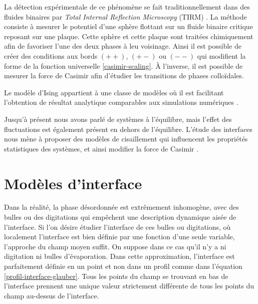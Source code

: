 La détection expérimentale de ce phénomène se fait traditionnellement dans des fluides binaires par \textit{Total Internal Reflection Microscopy} (TIRM) \cite{fukuto_critical_2005,hertlein_direct_2008,gambassi_critical_2009,edison_critical_2015-1}. La méthode consiste à mesurer le potentiel d'une sphère flottant sur un fluide binaire critique reposant sur une plaque. Cette sphère et cette plaque sont traitées chimiquement afin de favoriser l'une des deux phases à leu voisinage. Ainsi il est possible de créer des conditions aux bords $(++)$, $(+-)$ ou $(--)$ qui modifient la forme de la fonction universelle \ref{casimir-scaling}. À l'inverse, il est possible de mesurer la force de Casimir \cite{nguyen_controlling_2013} afin d'étudier les transitions de phases colloïdales.

Le modèle d'Ising appartient à une classe de modèles où il est facilitant l'obtention de résultat analytique \cite{hobrecht_critical_2017} comparables aux simulations numériques \cite{vasilyev_monte_2007,vasilyev_universal_2009,cardozo_finite_2015}.

Jusqu'à présent nous avons parlé de systèmes à l'équilibre, mais l'effet des fluctuations est également présent en dehors de l'équilibre. L'étude des interfaces nous mène à proposer des modèles de cisaillement qui influencent les propriétés statistiques des systèmes, et ainsi modifier la force de Casimir \cite{dean_out--equilibrium_2010}.

    \section{Modèles d'interface}

Dans la réalité, la phase désordonnée est extrêmement inhomogène, avec des bulles ou des digitations qui empêchent une description dynamique aisée de l'interface. Si l'on désire étudier l'interface de ces bulles ou digitations, où localement l'interface est bien définie par une fonction d'une seule variable, l'approche du champ moyen suffit. On suppose dans ce cas qu'il n'y a ni digitation ni bulles d'évaporation. Dans cette approximation, l'interface est parfaitement définie en un point et non dans un profil comme dans l'équation \ref{profil-interface-glauber}. Tous les points du champ se trouvant en bas de l'interface prennent une unique valeur strictement différente de tous les points du champ au-dessus de l'interface. 

